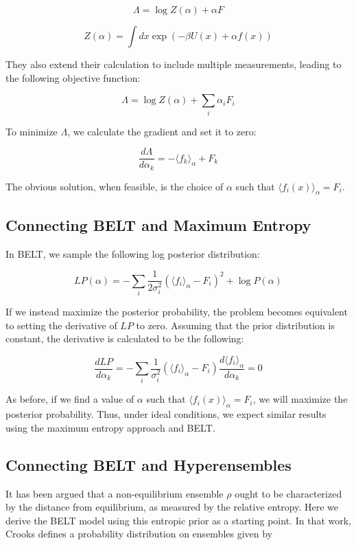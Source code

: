 \documentclass[12pt]{article}
\begin{document}
$$\Lambda = \log Z(\alpha) + \alpha F$$

$$Z(\alpha) = \int dx \exp(-\beta U(x) + \alpha f(x))$$

They also extend their calculation to include multiple measurements, leading to the following objective function:

$$\Lambda = \log Z(\alpha) + \sum_i \alpha_i F_i$$

To minimize $\Lambda$, we calculate the gradient and set it to zero:

$$\frac{d\Lambda}{d\alpha_k} = -\langle f_k \rangle_\alpha + F_k$$

The obvious solution, when feasible, is the choice of $\alpha$ such that $\langle f_i(x) \rangle_\alpha = F_i$.  


\subsection*{Connecting BELT and Maximum Entropy}


In BELT, we sample the following log posterior distribution:

$$LP(\alpha) = -\sum_i \frac{1}{2\sigma_i^2}(\langle f_i\rangle _\alpha - F_i)^2 + \log P(\alpha)$$

If we instead maximize the posterior probability, the problem becomes equivalent to setting the derivative of $LP$ to zero.  Assuming that the prior distribution is constant, the derivative is calculated to be the following:

$$ \frac{dLP}{d\alpha_k} =  -\sum_i \frac{1}{\sigma_i^2} (\langle f_i\rangle _\alpha - F_i) \frac{d\langle f_i\rangle _\alpha}{d\alpha_k} = 0$$

As before, if we find a value of $\alpha$ such that $\langle f_i(x) \rangle_\alpha = F_i$, we will maximize the posterior probability.  Thus, under ideal conditions, we expect similar results using the maximum entropy approach and BELT.  

\subsection*{Connecting BELT and Hyperensembles}

It has been argued \cite{crooks2007beyond} that a non-equilibrium ensemble $\rho$ ought to be characterized by the distance from equilibrium, as measured by the relative entropy.  Here we derive the BELT model using this entropic prior as a starting point.  In that work, Crooks defines a probability distribution on ensembles given by 
\end{document}
